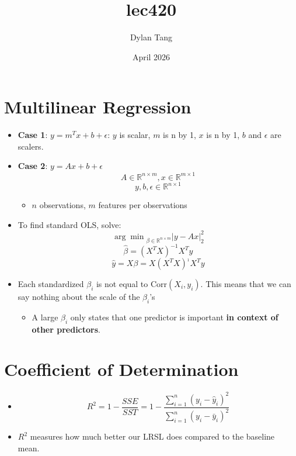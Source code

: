 \documentclass{article}
\title{lec420}
\author{Dylan Tang}
\date{April 2026}
\begin{document}
\maketitle

\section{Multilinear Regression}
\begin{itemize}
    \item \textbf{Case 1}: $y = m^Tx + b + \epsilon$: $y$ is scalar, $m$ is n by 1, $x$ is n by 1, $b$ and $\epsilon$ are scalers.
    \item \textbf{Case 2}: $y = Ax + b + \epsilon$
    \[
        A \in \mathbb{R}^{n \times m}, x \in \mathbb{R}^{m \times 1}
    \]
    \[
        y, b, \epsilon \in \mathbb{R}^{n \times 1}
    \]
    \begin{itemize}
        \item $n$ observations, $m$ features per observations
    \end{itemize}
    \item To find standard OLS, solve:
    \[
        {\arg\min}_{\beta \in \mathbb{R}^{n \times m}} |y - Ax|^2_2
    \]
    \[
        \hat{\beta} = (X^TX)^{-1}X^Ty
    \]
    \[
        \hat{y} = X\beta = X(X^TX)^{_1}X^Ty
    \]
    \item Each standardized $\beta_i$ is not equal to $\text{Corr}(X_i, y_i)$. This means that we can say nothing about the scale of the $\beta_i$'s
    \begin{itemize}
        \item A large $\beta_i$ only states that one predictor is important \textbf{in context of other predictors}.
    \end{itemize}
 \end{itemize}

\section{Coefficient of Determination}
\begin{itemize}
    \item
    \[
        R^2 = 1 - \frac{SSE}{SST} = 1 - \frac{\sum_{i = 1}^n (y_i - \hat{y}_i)^2}{\sum_{i = 1}^n (y_i - \bar{y}_i)^2}
    \]
    \item $R^2$ measures how much better our LRSL does compared to the baseline mean.
\end{itemize}
\end{document}
